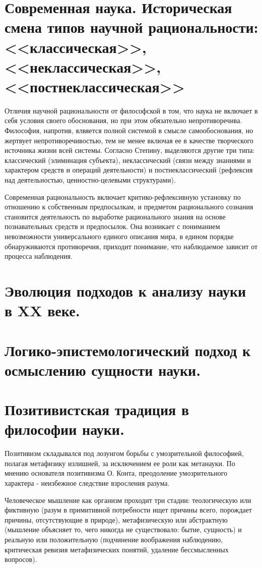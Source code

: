 \documentclass[12pt, specialist, subf, substylefile = spbu.rtx]{disser}
\begin{document}
\section{Современная наука. Историческая смена типов научной рациональности: <<классическая>>, <<неклассическая>>, <<постнеклассическая>>}
Отличия научной рациональности от философской в том, что наука не включает в себя условия своего обоснования, но при этом обязательно непротиворечива. Философия, напротив, ялвяется полной системой в смысле самообоснования, но жертвует непротиворечивостью, тем не менее включая ее в качестве творческого источника жизни всей системы.
Согласно Степину, выделяются другие три типа: классический (элиминация субъекта), неклассический (связи между знаниями и характером средств и операций деятельности) и постнеклассический (рефлексия над деятельностью, ценностно-целевыми структурами).

Современная рациональность включает критико-рефлексивную установку по отношению к собственным предпосылкам, и предметом рационального сознания становится деятельность по выработке рационального знания на основе познавательных средств и предпосылок. Она возникает с пониманием невозможности универсального единого описания мира, в едином порядке обнаруживаются противоречия, приходит понимание, что наблюдаемое зависит от процесса наблюдения.

\section{Эволюция подходов к анализу науки в XX веке.}

\section{Логико-эпистемологический подход к осмыслению сущности науки.}

\section{Позитивистская традиция в философии науки.}
Позитивизм складывался под лозунгом борьбы с умозрительной философией, полагая метафизику излишней, за исключением ее роли как метанауки. По мнению основателя позитивизма О. Конта, преодоление умозрительного характера - неизбежное следствие взросления разума.

Человеческое мышление как организм проходит три стадии: теологическую или фиктивную (разум в примитивной потребности ищет причины всего, порождает причины, отсутствующие в природе), метафизическую или абстрактную (мышление объясняет то, чего никогда не существовало: бытие, сущность) и реальную или положительную (подчинение воображения наблюдению, критическая ревизия метафизических понятий, удаление бессмысленных вопросов).
\end{document}
